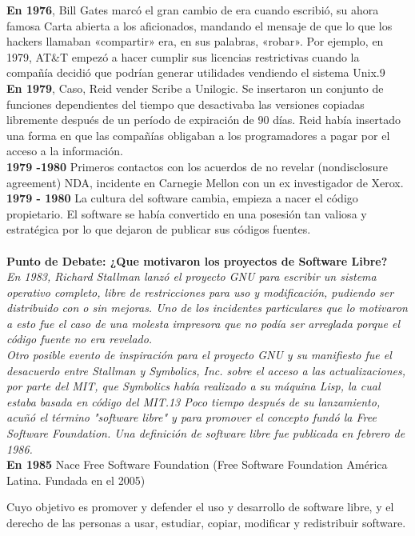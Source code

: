 \documentclass{book}
\begin{document}
{\bf En 1976}, Bill Gates marcó el gran cambio de era cuando escribió, su ahora famosa Carta abierta a los aficionados, mandando el mensaje de que lo que los hackers llamaban «compartir» era, en sus palabras, «robar». Por ejemplo, en 1979, AT\&T empezó a hacer cumplir sus licencias restrictivas cuando la compañía decidió que podrían generar utilidades vendiendo el sistema Unix.9
\\
{\bf En 1979}, Caso, Reid vender Scribe a Unilogic. Se insertaron un conjunto de funciones dependientes del tiempo que desactivaba las versiones copiadas libremente después de un período de expiración de 90 días.
Reid había insertado una forma en que las compañías obligaban a los programadores a pagar por el acceso a la información.
\\
{\bf 1979 -1980} Primeros contactos con los acuerdos de no revelar (nondisclosure agreement) NDA, incidente en Carnegie Mellon con un ex investigador de Xerox.
\\
{\bf 1979 - 1980} La cultura del software cambia, empieza a nacer el código propietario.
El software se había convertido en una posesión tan valiosa y estratégica por lo que dejaron de publicar sus códigos fuentes.
\\
\\
{\bf Punto de Debate: ¿Que motivaron los proyectos de Software Libre?}
{\it 
\\
En 1983, Richard Stallman lanzó el proyecto GNU para escribir un sistema operativo completo, libre de restricciones para uso y modificación, pudiendo ser distribuido con o sin mejoras. Uno de los incidentes particulares que lo motivaron a esto fue el caso de una molesta impresora que no podía ser arreglada porque el código fuente no era revelado.
\\
Otro posible evento de inspiración para el proyecto GNU y su manifiesto fue el desacuerdo entre Stallman y Symbolics, Inc. sobre el acceso a las actualizaciones, por parte del MIT, que Symbolics había realizado a su máquina Lisp, la cual estaba basada en código del MIT.13 Poco tiempo después de su lanzamiento, acuñó el término "software libre" y para promover el concepto fundó la Free Software Foundation.
Una definición de software libre fue publicada en febrero de 1986.
}
\\
{\bf En 1985} Nace Free Software Foundation (Free Software Foundation América Latina. Fundada en el 2005)

Cuyo objetivo es promover y defender el uso y desarrollo de software libre, y el derecho de las personas a usar, estudiar, copiar, modificar y redistribuir software.
\end{document}
